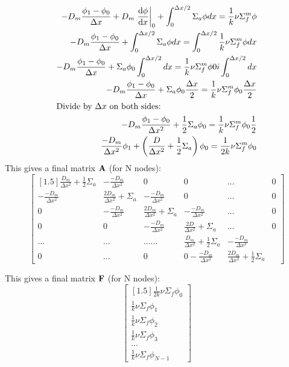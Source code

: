 \documentclass[../main.tex]{subfiles}
\begin{document}
	\begin{align*}
		-D_m \frac{\phi_1 - \phi_0}{\Delta x} + D_m \left. \dv{\phi}{x} \right|_0 + \int_0^{\Delta x / 2} 
			\Sigma_a \phi dx =   \frac{1}{k} \nu \Sigma^m_f \phi \\
		-D_m \frac{\phi_1 - \phi_0}{\Delta x} +  \int_0^{\Delta x / 2} 
			\Sigma_a \phi dx = \int_0^{\Delta x / 2}  \frac{1}{k} \nu \Sigma^m_f \phi dx \\
		-D_m \frac{\phi_1 - \phi_0}{\Delta x} + \Sigma_a \phi_0 \int_0^{\Delta x / 2}
			dx = \frac{1}{k} \nu \Sigma^m_f \phi0i \int_0^{\Delta x / 2} dx \\
			-D_m \frac{\phi_1 - \phi_0}{\Delta x} + \Sigma_a \phi_0  \frac{\Delta x}{2} = \frac{1}{k} \nu \Sigma^m_f \phi_0 \frac{\Delta x}{2} \\
	\intertext{Divide by $\Delta x$ on both sides:}
		-D_m \frac{\phi_1 - \phi_0}{\Delta x^2}  + \frac{1}{2} \Sigma_a \phi_0 =  \frac{1}{k} \nu \Sigma^m_f \phi_0 \frac{1}{2} \\
		\frac{-D_m}{\Delta x^2} \phi_1 + \left( \frac{D}{\Delta x^2} + \frac{1}{2} \Sigma_a \right) \phi_0 = \frac{1}{2k} \nu \Sigma^m_f \phi_0
	\end{align*}
	This gives a final matrix $\mathbf{A}$ (for N nodes):
	\[
	\begin{bmatrix}[1.5]
		\frac{D_m}{\Delta x^2} + \frac{1}{2}\Sigma_a & - \frac{-D_m}{\Delta x^2} & 0 & 0 & \dots & 0\\
		- \frac{-D_m}{\Delta x^2} & \frac{2D_m}{\Delta x^2} + \Sigma_a & - \frac{-D_m}{\Delta x^2} & 0 & \dots & 0 \\
		0 & - \frac{-D_m}{\Delta x^2} & \frac{2D_m}{\Delta x^2} + \Sigma_a & - \frac{-D_m}{\Delta x^2} & \dots & 0 \\
		0 & 0 & - \frac{-D_m}{\Delta x^2} & \frac{2D}{\Delta x^2} + \Sigma_a & \dots & 0 \\
		\dots & \dots & \dots \dots & \frac{D_m}{\Delta x^2} + \frac{1}{2}\Sigma_a & - \frac{-D_m}{\Delta x^2} \\
		0 & \dots & 0 & 0 - \frac{-D_m}{\Delta x^2} & \frac{2 D_m}{\Delta x^2} + \frac{1}{2}\Sigma_a
	\end{bmatrix}
	\]


This gives a final matrix $\mathbf{F}$ (for N nodes):
	\[
	\begin{bmatrix}[1.5]
		\frac{1}{2k} \nu \Sigma_f \phi_0  \\
		\frac{1}{k} \nu \Sigma_f \phi_1  \\
		\frac{1}{k} \nu \Sigma_f \phi_2  \\
		\frac{1}{k} \nu \Sigma_f \phi_3  \\
		\dots \\
		\frac{1}{k} \nu \Sigma_f \phi_{N-1}
	\end{bmatrix}
	\]
\end{document}
